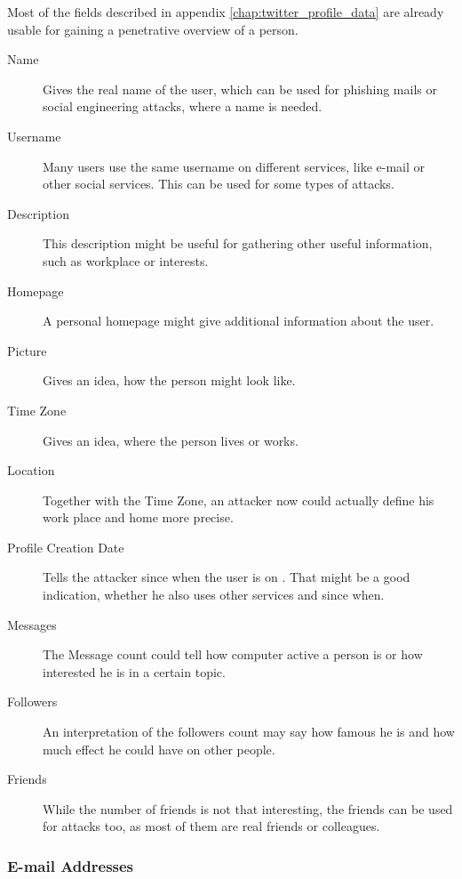 Most of the fields described in appendix \ref{chap:twitter_profile_data} are
already usable for gaining a penetrative overview of a person.

\begin{description}
\item[Name] Gives the real name of the user, which can be used for
phishing mails or social engineering attacks, where a name is needed.

\item[Username] Many users use the same username on different
services, like e-mail or other social services. This can be used for some types
of attacks.

\item[Description] This description might be useful for gathering other useful
information, such as workplace or interests.

\item[Homepage] A personal homepage might give additional
information about the user.

\item[Picture] Gives an idea, how the person might
look like.

\item[Time Zone] Gives an idea, where the person
lives or works.

\item[Location] Together with the Time Zone, an attacker now
could actually define his work place and home more precise.

\item[Profile Creation Date] Tells the attacker
since when the user is on \Twitter{}. That might be a good indication,
whether he also uses other services and since when.

\item[Messages] The Message count could tell how computer active a person is 
or how interested he is in a certain topic.

\item[Followers] An interpretation of the followers count may say how
famous he is and how much effect he could have on other people.

\item[Friends] While the number of friends is not that interesting,
the friends can be used for attacks too, as most of them are real friends
or colleagues.
\end{description}

\subsubsection{E-mail Addresses}

